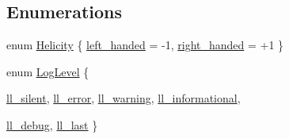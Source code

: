 \subsection*{Enumerations}
\begin{DoxyCompactItemize}
\item 
enum \hyperlink{namespaceeos_a4b2f8b0a4184d635cfc47c4ee234aea5}{Helicity} \{ \hyperlink{namespaceeos_a4b2f8b0a4184d635cfc47c4ee234aea5a01df88b4e8525e89646a0bd5d0fdbd01}{left\_\-handed} =  -\/1, 
\hyperlink{namespaceeos_a4b2f8b0a4184d635cfc47c4ee234aea5ae7094996100231c5a5583bb323488b18}{right\_\-handed} =  +1
 \}
\item 
enum \hyperlink{namespaceeos_ad6b42a08a08a1b63498f3f262bd15602}{LogLevel} \{ \par
\hyperlink{namespaceeos_ad6b42a08a08a1b63498f3f262bd15602a9ba67f079c0a9154e568f0d207c5931b}{ll\_\-silent}, 
\hyperlink{namespaceeos_ad6b42a08a08a1b63498f3f262bd15602ab160ece1c3e71b2fdf17ffd3b74b1d8f}{ll\_\-error}, 
\hyperlink{namespaceeos_ad6b42a08a08a1b63498f3f262bd15602a5239af800d9d8cb9b83e52ee6b768941}{ll\_\-warning}, 
\hyperlink{namespaceeos_ad6b42a08a08a1b63498f3f262bd15602a550a3ef110e24df3eb71bc7fcefe53f3}{ll\_\-informational}, 
\par
\hyperlink{namespaceeos_ad6b42a08a08a1b63498f3f262bd15602ab4e8e8cf581d697726f51bc8afcb0499}{ll\_\-debug}, 
\hyperlink{namespaceeos_ad6b42a08a08a1b63498f3f262bd15602a8fb5a1db33a7ac4dbe90a00ff09529de}{ll\_\-last}
 \}
\end{DoxyCompactItemize}
